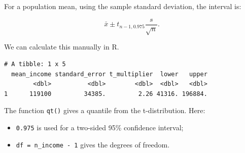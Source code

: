 \documentclass[
  letterpaper,
  DIV=11,
  numbers=noendperiod]{scrreprt}
\newenvironment{Shaded}{\begin{snugshade}}{\end{snugshade}}
\newcommand{\AttributeTok}[1]{\textcolor[rgb]{0.40,0.45,0.13}{#1}}
\newcommand{\DecValTok}[1]{\textcolor[rgb]{0.68,0.00,0.00}{#1}}
\newcommand{\FloatTok}[1]{\textcolor[rgb]{0.68,0.00,0.00}{#1}}
\newcommand{\FunctionTok}[1]{\textcolor[rgb]{0.28,0.35,0.67}{#1}}
\newcommand{\NormalTok}[1]{\textcolor[rgb]{0.00,0.23,0.31}{#1}}
\newcommand{\OtherTok}[1]{\textcolor[rgb]{0.00,0.23,0.31}{#1}}
\newcommand{\SpecialCharTok}[1]{\textcolor[rgb]{0.37,0.37,0.37}{#1}}
\providecommand{\tightlist}{%
  \setlength{\itemsep}{0pt}\setlength{\parskip}{0pt}}
\begin{document}
For a population mean, using the sample standard deviation, the interval
is:

\[
\bar{x}
\pm
 t_{n-1,0.975}
\frac{s}{\sqrt{n}}.
\]

We can calculate this manually in R.

\begin{Shaded}
\end{Shaded}

\begin{verbatim}
# A tibble: 1 x 5
  mean_income standard_error t_multiplier  lower   upper
        <dbl>          <dbl>        <dbl>  <dbl>   <dbl>
1      119100         34385.         2.26 41316. 196884.
\end{verbatim}

The function \texttt{qt()} gives a quantile from the t-distribution.
Here:

\begin{itemize}
\tightlist
\item
  \texttt{0.975} is used for a two-sided 95\% confidence interval;
\item
  \texttt{df\ =\ n\_income\ -\ 1} gives the degrees of freedom.
\end{itemize}
\end{document}
